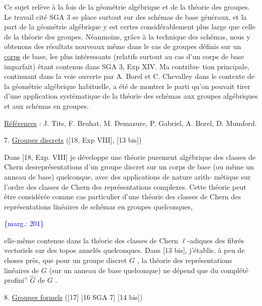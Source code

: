 \documentclass[11pt]{article}
\newcommand{\scanpage}[1]{\par\bigskip\noindent{\small\sffamily[scan #1]}\par}
\newcommand{\mspage}[1]{{\small\sffamily[p.\,#1]}}
\newcommand{\hand}[1]{\textcolor{blue}{#1}}
\newcommand{\margin}[1]{\textcolor{blue}{\{\textsf{marg.:} #1\}}}
\newcommand{\uline}[1]{\underline{#1}}
\begin{document}
Ce sujet relève à la fois de la géométrie algébrique et de la théorie
des groupes. Le travail cité SGA 3 se place surtout sur des schémas de base
généraux, et la part de la géométrie algébrique y est certes considérablement
plus large que celle de la théorie des groupes. Néanmoins, grâce à la technique
des schémas, nous y obtenons des résultats nouveaux même dans le cas de groupes
définis sur un \uline{corps} de base, les plus intéressants (relatifs surtout au cas
d'un corps de base imparfait) étant contenus dans SGA 3, Exp XIV. Ma contribu-%
tion principale, continuant dans la voie ouverte par A. Borel et C. Chevalley
dans le contexte de la géométrie algébrique habituelle, a été de montrer le
parti qu'on pouvait tirer d'une application systématique de la théorie des
schémas aux groupes algébriques et aux schémas en groupes.

\uline{Références} : J. Tits, F. Bruhat, M. Demazure, P. Gabriel, A. Borel, D. Mumford.

7. \uline{Groupes discrets} ([18, Exp VIII], [13 bis])

Dans [18, Exp. VIII] je développe une théorie purement algébrique des
classes de Chern desreprésentations d'un groupe discret sur un corps de base
(ou même un anneau de base) quelconque, avec des applications de nature arith-%
métique sur l'ordre des classes de Chern des représentations complexes. Cette
théorie peut être considérée comme cas particulier d'une théorie des classes
de Chern des représentations linéaires de schémas en groupes quelconques,

\margin{201}

\clearpage
\scanpage{119/202}
\mspage{- 7 -}

elle-même contenue dans la théorie des classes de Chern \hand{$\ell$}-adiques des fibrés
vectoriels sur des topos annelés quelconques. Dans [13 bis], j'établis, à peu
de choses près, que pour un groupe discret $G$ , la théorie des représentations
linéaires de $G$ (sur un anneau de base quelconque) ne dépend que du
complété profini'' $\hat{G}$ de $G$ .

8. \uline{Groupes formels} ([17] [16 SGA 7] [14 bis])
\end{document}
